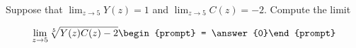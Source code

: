 \documentclass{ximera}
\author{Matthew Carr}
\begin{document}
\begin{exercise}
Suppose that $\lim_{z\to5}Y(z)=1$ and $\lim_{z\to5}C(z)=-2$. Compute the limit

\[
\lim_{z\to 5 } \sqrt[5]{Y(z)C(z)-2}\begin{prompt} = \answer{0}\end{prompt}
\]
\end{exercise}
\end{document}

